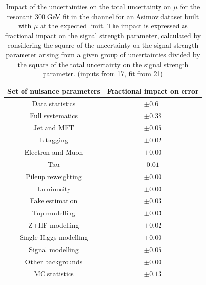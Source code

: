 \begin{table}
\centering
\begin{tabular}{|c|c|}
\hline
Set of nuisance parameters & Fractional impact on error\\
\hline
Data statistics & $\pm 0.61$\\
Full systematics & $\pm 0.38$\\
Jet and MET & $\pm 0.05$ \\
b-tagging & $\pm 0.02$\\
Electron and Muon & $\pm 0.00$\\
Tau & $0.01$\\
Pileup reweighting & $\pm 0.00$\\
Luminosity & $\pm 0.00$\\
Fake estimation & $\pm 0.03$\\
Top modelling & $\pm 0.03$\\ 
Z+HF modelling & $\pm 0.02$\\
Single Higgs modelling & $\pm 0.00$\\
Signal modelling & $\pm 0.05$\\
Other backgrounds & $\pm 0.00$\\
MC statistics & $\pm 0.13$\\
\hline
\end{tabular}
\caption{Impact of the uncertainties on the total uncertainty on $\mu$ for the resonant 300 GeV fit in the \hadhad channel for an Asimov dataset built with $\mu$ at the expected limit. The impact is expressed as fractional impact on the signal strength parameter,  calculated by considering the square of the uncertainty on the signal strength parameter arising from a given group of uncertainties divided by the square of the total uncertainty on the signal strength parameter.  (inputs from 17, fit from 21)}
\label{sec:fit:tab:HadHadBreakdown2HDM300Asimov}
\end{table}

